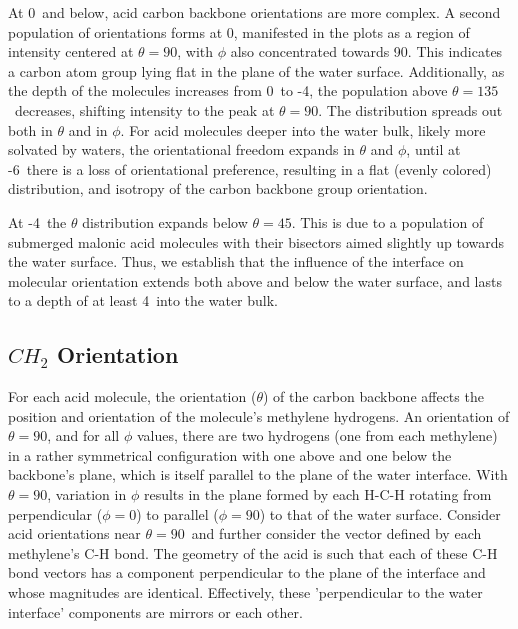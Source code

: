 At 0\angs~and below, acid carbon backbone orientations are more complex. A second population of orientations forms at 0\angs, manifested in the plots as a region of intensity centered at $\theta=90$\textdegree, with $\phi$ also concentrated towards 90\textdegree. This indicates a carbon atom group lying flat in the plane of the water surface. Additionally, as the depth of the molecules increases from 0\angs~to -4\angs, the population above $\theta=135$\textdegree~decreases, shifting intensity to the peak at $\theta=90$\textdegree. The distribution spreads out both in $\theta$ and in $\phi$. For acid molecules deeper into the water bulk, likely more solvated by waters, the orientational freedom expands in $\theta$ and $\phi$, until at -6\angs~there is a loss of orientational preference, resulting in a flat (evenly colored) distribution, and isotropy of the carbon backbone group orientation.

At -4\angs~the $\theta$ distribution expands below $\theta=45$\textdegree. This is due to a population of submerged malonic acid molecules with their bisectors aimed slightly up towards the water surface. Thus, we establish that the influence of the interface on molecular orientation extends both above and below the water surface, and lasts to a depth of at least 4\angs~into the water bulk.


\subsection {$CH_2$ Orientation}

For each acid molecule, the orientation ($\theta$) of the carbon backbone affects the position and orientation of the molecule's methylene hydrogens. An orientation of $\theta=90$\textdegree, and for all $\phi$ values, there are two hydrogens (one from each methylene) in a rather symmetrical configuration with one above and one below the backbone's plane, which is itself parallel to the plane of the water interface. With $\theta=90$\textdegree, variation in $\phi$ results in the plane formed by each H-C-H rotating from perpendicular ($\phi=0$\textdegree) to parallel ($\phi=90$\textdegree) to that of the water surface. Consider acid orientations near $\theta=90$\textdegree~and further consider the vector defined by each methylene's C-H bond. The geometry of the acid is such that each of these C-H bond vectors has a component perpendicular to the plane of the interface and whose magnitudes are identical. Effectively, these 'perpendicular to the water interface' components are mirrors or each other. 

